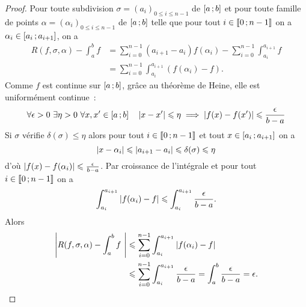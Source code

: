 \begin{proof}
  Pour toute subdivision $\sigma=(a_i)_{0 \leqslant i \leqslant n-1}$ de $\left[ a \, ;  b \right]$ et pour toute famille de points $\alpha=(\alpha_i)_{0 \leqslant i \leqslant n-1}$ de $\left[ a \, ;  b \right]$ telle que pour tout $i \in \mathopen{\llbracket}0\mathclose{}\mathpunct{};n-1\mathclose{\rrbracket}$ on a $\alpha_i \in \left[ a_i \, ;  a_{i+1} \right]$, on a
  \begin{align}
    R(f,\sigma,\alpha)- \int_a^b f &= \sum_{i=0}^{n-1}(a_{i+1}-a_i)f(\alpha_i) - \sum_{i=0}^{n-1} \int_{a_i}^{a_{i+1}} f \\
    &=\sum_{i=0}^{n-1} \int_{a_i}^{a_{i+1}} (f(\alpha_i)-f).
  \end{align}
  Comme $f$ est continue sur $\left[ a \, ;  b \right]$, grâce au théorème de Heine, elle est uniformément continue~:
  \begin{equation}
    \forall \epsilon >0 \ \exists \eta >0 \ \forall x,x' \in \intervalleff{a}{b} \quad \abs{x-x'} \leqslant \eta \implies \abs{f(x)-f(x')} \leqslant \frac{\epsilon}{b-a}
  \end{equation}
  Si $\sigma$ vérifie $\delta(\sigma) \leqslant \eta$ alors pour tout $i \in \mathopen{\llbracket}0\mathclose{}\mathpunct{};n-1\mathclose{\rrbracket}$ et tout $x \in \left[ a_i \, ;  a_{i+1} \right]$ on a
  \begin{equation}
    \left\lvert x-\alpha_i\right\rvert \leqslant \left\lvert a_{i+1}-a_i\right\rvert \leqslant \delta(\sigma) \leqslant \eta
  \end{equation}
  d'où $\left\lvert f(x)-f(\alpha_i)\right\rvert \leqslant \frac{\epsilon}{b-a}$. Par croissance de l'intégrale et pour tout $i \in \mathopen{\llbracket}0\mathclose{}\mathpunct{};n-1\mathclose{\rrbracket}$ on a
  \begin{equation}
    \int_{a_i}^{a_{i+1}} \left\lvert f(\alpha_i)-f\right\rvert \leqslant \int_{a_i}^{a_{i+1}}\frac{\epsilon}{b-a}.
  \end{equation}
  Alors
  \begin{align}
    \left\lvert R(f,\sigma,\alpha)- \int_a^b f~\right\rvert &\leqslant \sum_{i=0}^{n-1} \int_{a_i}^{a_{i+1}} \left\lvert f(\alpha_i)-f\right\rvert \\
    &\leqslant \sum_{i=0}^{n-1} \int_{a_i}^{a_{i+1}}\frac{\epsilon}{b-a} = \int_a^b \frac{\epsilon}{b-a}=\epsilon.
  \end{align}
\end{proof}

